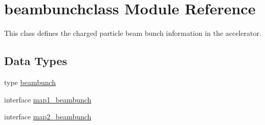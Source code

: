 \hypertarget{namespacebeambunchclass}{}\section{beambunchclass Module Reference}
\label{namespacebeambunchclass}


This class defines the charged particle beam bunch information in the accelerator.  


\subsection*{Data Types}
\begin{DoxyCompactItemize}
\item 
type \mbox{\hyperlink{namespacebeambunchclass_structbeambunchclass_1_1beambunch}{beambunch}}
\item 
interface \mbox{\hyperlink{interfacebeambunchclass_1_1map1__beambunch}{map1\+\_\+beambunch}}
\item 
interface \mbox{\hyperlink{interfacebeambunchclass_1_1map2__beambunch}{map2\+\_\+beambunch}}
\end{DoxyCompactItemize}
